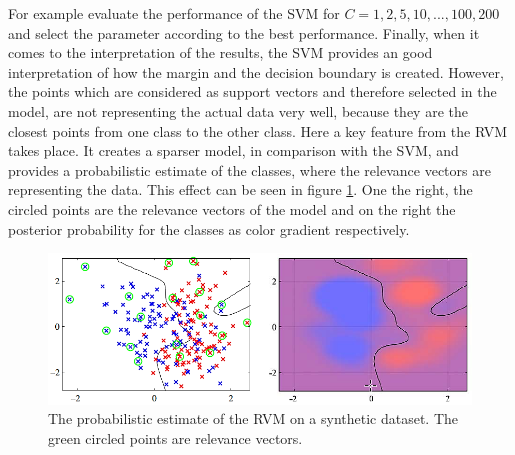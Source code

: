 For example evaluate the performance of the \ac{SVM} for $C={1,2,5,10,...,100,200}$ and select the parameter according to the best performance.\cite{Chen.2009}\newline
Finally, when it comes to the interpretation of the results, the \ac{SVM} provides an good interpretation of how the margin and the decision boundary is created.
However, the points which are considered as support vectors and therefore selected in the model, are not representing the actual data very well, because they are the closest points from one class to the other class.\cite[p. 326]{Bishop.2009}\newline
Here a key feature from the \ac{RVM} takes place. It creates a sparser model, in comparison with the \ac{SVM}, and provides a probabilistic estimate of the classes, where the relevance vectors are representing the data.\cite[p. 335-356]{Bishop.2009}\newline
This effect can be seen in figure \ref{FigRVMProbEst}.
One the right, the circled points are the relevance vectors of the model and on the right the posterior probability for the classes as color gradient respectively.
\begin{figure}
	\centering
	\includegraphics[width=.8\linewidth]{figures/RVMProbEst.png}
	\caption[Probabilistic Estimate of the RVM]{The probabilistic estimate of the \acs{RVM} on a synthetic dataset. The green circled points are relevance vectors.\cite[p. 356]{Bishop.2009}}
	\label{FigRVMProbEst}
\end{figure}

